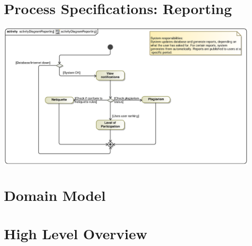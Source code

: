 \documentclass{scrreprt}
\begin{document}
\chapter{Process Specifications: Reporting}
\includegraphics[scale=.9]{graphics/activityDiagramReporting.eps}\\

\chapter{Domain Model}

\chapter{High Level Overview}
\end{document}

